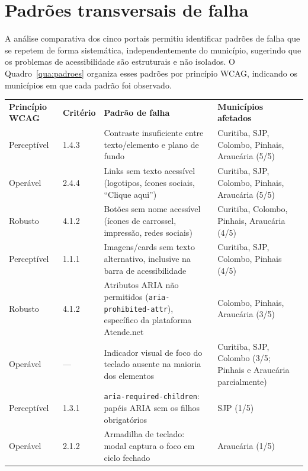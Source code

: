 \documentclass[brazil]{ifpr-pinhais}
\begin{document}
\section{Padrões transversais de falha}
\label{sec:padroes}

A análise comparativa dos cinco portais permitiu identificar padrões de falha que se repetem de forma sistemática, independentemente do município, sugerindo que os problemas de acessibilidade são estruturais e não isolados. O Quadro~\ref{qua:padroes} organiza esses padrões por princípio WCAG, indicando os municípios em que cada padrão foi observado.

\begin{quadro}[htb]
\caption{Padrões transversais de falha identificados nos portais analisados}
\label{qua:padroes}
\begin{tabular}{p{2.3cm} p{1.4cm} p{6.4cm} p{2.7cm}}
\rowcolor{headerblue}
\color{white}\textbf{Princípio WCAG} & \color{white}\textbf{Critério} & \color{white}\textbf{Padrão de falha} & \color{white}\textbf{Municípios afetados} \\
Perceptível   & 1.4.3 & Contraste insuficiente entre texto/elemento e plano de fundo & Curitiba, SJP, Colombo, Pinhais, Araucária (5/5) \\
Operável      & 2.4.4 & Links sem texto acessível (logotipos, ícones sociais, ``Clique aqui'') & Curitiba, SJP, Colombo, Pinhais, Araucária (5/5) \\
Robusto       & 4.1.2 & Botões sem nome acessível (ícones de carrossel, impressão, redes sociais) & Curitiba, Colombo, Pinhais, Araucária (4/5) \\
Perceptível   & 1.1.1 & Imagens/cards sem texto alternativo, inclusive na barra de acessibilidade & Curitiba, SJP, Colombo, Pinhais (4/5) \\
Robusto       & 4.1.2 & Atributos ARIA não permitidos (\texttt{aria-prohibited-attr}), específico da plataforma Atende.net & Colombo, Pinhais, Araucária (3/5) \\
Operável      & --- & Indicador visual de foco do teclado ausente na maioria dos elementos & Curitiba, SJP, Colombo (3/5; Pinhais e Araucária parcialmente) \\
Perceptível   & 1.3.1 & \texttt{aria-required-children}: papéis ARIA sem os filhos obrigatórios & SJP (1/5) \\
Operável      & 2.1.2 & Armadilha de teclado: modal captura o foco em ciclo fechado & Araucária (1/5) \\
\end{tabular}
\end{quadro}
\end{document}

